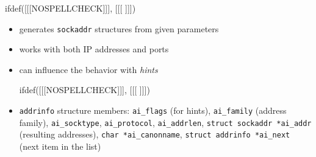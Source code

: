 
ifdef([[[NOSPELLCHECK]]], [[[
]]])

\label{GETADDRINF}

\begin{slide}

\begin{itemize}
\item generates \texttt{sockaddr} structures from given parameters
\item works with both IP addresses and ports
\item can influence the behavior with \emph{hints}

ifdef([[[NOSPELLCHECK]]], [[[
]]])
\item \texttt{addrinfo} structure members:
\texttt{ai\_flags} (for hints), \texttt{ai\_family} (address family),
\texttt{ai\_socktype}, \texttt{ai\_protocol}, \texttt{ai\_addrlen},
\texttt{struct sockaddr *ai\_addr} (resulting addresses),
\texttt{char *ai\_canonname},
\texttt{struct addrinfo *ai\_next} (next item in the list)
\end{itemize}
\end{slide}

